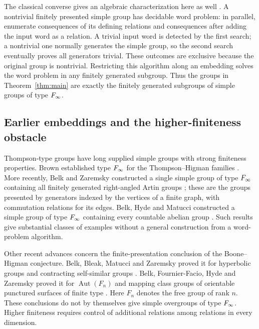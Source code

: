 The classical converse gives an algebraic characterization here as
well \citep{BH74}. A nontrivial finitely presented simple group has
decidable word
problem: in parallel, enumerate consequences of its defining relations
and consequences after adding the input word as a relation. A trivial
input word is detected by the first search; a nontrivial one normally
generates the simple group, so the second search eventually proves all
generators trivial. These outcomes are exclusive because the original
group is nontrivial. Restricting this algorithm along an embedding
solves the word problem in any finitely generated subgroup. Thus the
groups in Theorem~\ref{thm:main} are exactly the finitely generated
subgroups of simple groups of type \(F_\infty\).

\subsection{Earlier embeddings and the higher-finiteness obstacle}

Thompson-type groups have long supplied simple groups with strong
finiteness properties. Brown established type \(F_\infty\) for the
Thompson--Higman families \citep[Section~4]{Brown1987}.
More recently, Belk and Zaremsky constructed a single simple group of
type \(F_\infty\) containing all finitely generated right-angled Artin
groups \citep[Corollary~E]{BelkZaremsky2022}; these are the groups
presented by generators indexed by the vertices of a finite graph,
with commutation relations for its edges. Belk, Hyde and Matucci
constructed a simple group of type \(F_\infty\) containing every
countable abelian group \citep[Theorems~4.4--4.6]{BHMgerms}.
Such results give substantial classes of examples without a general
construction from a word-problem algorithm.

Other recent advances concern the finite-presentation conclusion of
the Boone--Higman conjecture. Belk, Bleak, Matucci and Zaremsky proved
it for hyperbolic groups and contracting self-similar groups
\citep[Theorem~A and Corollary~D]{BBMZhyperbolic}.
Belk, Fournier-Facio, Hyde and Zaremsky proved it for
\(\operatorname{Aut}(F_n)\) and mapping class groups of orientable
punctured surfaces of finite type
\citep[Theorem~A and Corollary~B]{BFFHZ}.
Here \(F_n\) denotes the free group of rank \(n\).
These conclusions do not by themselves give simple overgroups of type
\(F_\infty\). Higher finiteness requires control of additional
relations among relations in every dimension.

